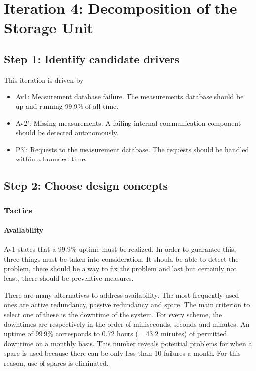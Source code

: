 \section{Iteration 4: Decomposition of the Storage Unit}
\label{add:it4}

\subsection{Step 1: Identify candidate drivers}
\label{add:it4/drivers}

\npar This iteration is driven by

\begin{itemize}
	\item Av1: Measurement database failure. The measurements database should be up
	and running 99.9\% of all time. 
	\item Av2': Missing measurements. A failing internal communication component
	should be detected autonomously. 
  	\item P3': Requests to the measurement database. The requests should be
  	handled within a bounded time. 
\end{itemize}

\subsection{Step 2: Choose design concepts}
\label{add:it4/concepts}

\subsubsection{Tactics}
\label{add:it4/tactics}

\paragraph{Availability} 

\npar Av1 states that a 99.9\% uptime must be realized. In order to guarantee
this, three things must be taken into consideration. It should be able to detect
the problem, there should be a way to fix the problem and last but certainly not
least, there should be preventive measures.

\npar There are many alternatives to address availability. The most frequently
used ones are active redundancy, passive redundancy and spare. The main
criterion to select one of these is the downtime of the system. For every
scheme, the downtimes are respectively in the order of milliseconds, seconds and
minutes. An uptime of 99.9\% corresponds to 0.72 hours (= 43.2 minutes) of
permitted downtime on a monthly basis. This number reveals potential problems
for when a spare is used because there can be only less than 10 failures a
month. For this reason, use of spares is eliminated.

